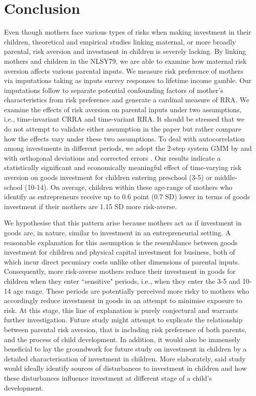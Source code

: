 \documentclass[emulatestandardclasses, 10pt, abstract = true]{scrartcl}
\begin{document}
\section{Conclusion}
Even though mothers face various types of risks when making investment in their children, theoretical and empirical studies linking maternal, or more broadly parental, risk aversion and investment in children is severely lacking. By linking mothers and children in the NLSY79, we are able to examine how maternal risk aversion affects various parental inputs. We measure risk preference of mothers via imputations taking as inputs survey responses to lifetime income gamble. Our imputations follow \citet{kimball2008imputing,kimball2009risk} to separate potential confounding factors of mother's characteristics from risk preference and generate a cardinal measure of RRA. We examine the effects of risk aversion on parental inputs under two assumptions, i.e., time-invariant CRRA and time-variant RRA. It should be stressed that we do not attempt to validate either assumption in the paper but rather compare how the effects vary under these two assumptions. To deal with autocorrelation among investments in different periods, we adopt the 2-step system GMM by \citet{arellano1991some} and \citet{blundell1998initial} with orthogonal deviations \citep{arellano1995another} and corrected errors \citep{windmeijer2005finite}. Our results indicate a statistically significant and economically meaningful effect of time-varying risk aversion on goods investment for children entering preschool (3-5) or middle-school (10-14). On average, children within these age-range of mothers who identify as entrepreneurs receive up to 0.6 point (0.7 SD) lower in terms of goods investment if their mothers are 1.15 SD more risk-averse. 

We hypothesise that this pattern arise because mothers act as if investment in goods are, in nature, similar to investment in an entrepreneurial setting. A reasonable explanation for this assumption is the resemblance between goods investment for children and physical capital investment for business, both of which incur direct pecuniary costs unlike other dimensions of parental inputs. Consequently, more risk-averse mothers reduce their investment in goods for children when they enter ``sensitive" periods, i.e., when they enter the 3-5 and 10-14 age range. These periods are potentially perceived more risky to mothers who accordingly reduce investment in goods in an attempt to minimise exposure to risk. At this stage, this line of explanation is purely conjectural and warrants further investigation. Future study might attempt to explicate the relationship between parental risk aversion, that is including risk preference of both parents, and the process of child development. In addition, it would also be immensely beneficial to lay the groundwork for future study on investment in children by a detailed characterisation of investment in children. More elaborately, said study would ideally identify sources of disturbances to investment in children and how these disturbances influence investment at different stage of a child's development.
\end{document}
